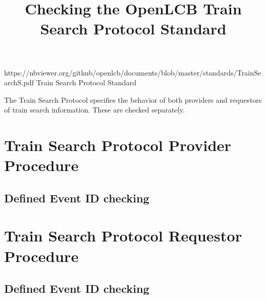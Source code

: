 

\title{Checking the OpenLCB Train Search Protocol Standard}


\maketitle


\introductionCaveats
    {https://nbviewer.org/github/openlcb/documents/blob/master/standards/TrainSearchS.pdf}
    {Train Search Protocol Standard}

The Train Search Protocol specifies the behavior of both providers and requestors of 
train search information.  These are checked separately.


\section{Train Search Protocol Provider Procedure}


\subsection{Defined Event ID checking}


\section{Train Search Protocol Requestor Procedure}


\subsection{Defined Event ID checking}


  
